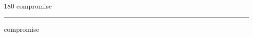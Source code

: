 
\begin{frame}
\begin{center}
\begin{turn}{180}
{\fontsize{2.5cm}{1em}\selectfont compromise}
\end{turn}
\vspace{1em}\par  
\hrule
\vspace{1em}\par  
{\fontsize{2.5cm}{1em}\selectfont compromise}
\end{center}
\end{frame}
